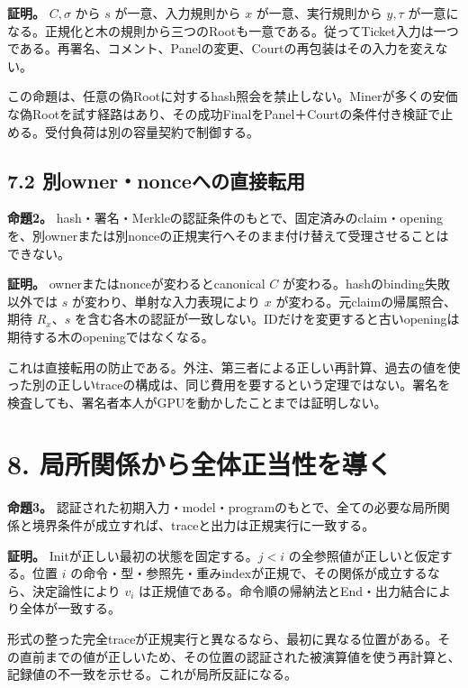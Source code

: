 \documentclass[
  10pt,
]{article}
\begin{document}
\textbf{証明。} \(C,\sigma\) から \(s\) が一意、入力規則から \(x\)
が一意、実行規則から \(y,\tau\)
が一意になる。正規化と木の規則から三つのRootも一意である。従ってTicket入力は一つである。再署名、コメント、Panelの変更、Courtの再包装はその入力を変えない。

この命題は、任意の偽Rootに対するhash照会を禁止しない。Minerが多くの安価な偽Rootを試す経路はあり、その成功FinalをPanel＋Courtの条件付き検証で止める。受付負荷は別の容量契約で制御する。

\subsection{7.2
別owner・nonceへの直接転用}\label{ux5225ownernonceux3078ux306eux76f4ux63a5ux8ee2ux7528}

\textbf{命題2。}
hash・署名・Merkleの認証条件のもとで、固定済みのclaim・openingを、別ownerまたは別nonceの正規実行へそのまま付け替えて受理させることはできない。

\textbf{証明。} ownerまたはnonceが変わるとcanonical \(C\)
が変わる。hashのbinding失敗以外では \(s\) が変わり、単射な入力表現により
\(x\) が変わる。元claimの帰属照合、期待 \(R_x\)、\(s\)
を含む各木の認証が一致しない。IDだけを変更すると古いopeningは期待する木のopeningではなくなる。

これは直接転用の防止である。外注、第三者による正しい再計算、過去の値を使った別の正しいtraceの構成は、同じ費用を要するという定理ではない。署名を検査しても、署名者本人がGPUを動かしたことまでは証明しない。

\section{8.
局所関係から全体正当性を導く}\label{ux5c40ux6240ux95a2ux4fc2ux304bux3089ux5168ux4f53ux6b63ux5f53ux6027ux3092ux5c0eux304f}

\textbf{命題3。}
認証された初期入力・model・programのもとで、全ての必要な局所関係と境界条件が成立すれば、traceと出力は正規実行に一致する。

\textbf{証明。} Initが正しい最初の状態を固定する。\(j<i\)
の全参照値が正しいと仮定する。位置 \(i\)
の命令・型・参照先・重みindexが正規で、その関係が成立するなら、決定論性により
\(v_i\)
は正規値である。命令順の帰納法とEnd・出力結合により全体が一致する。

形式の整った完全traceが正規実行と異なるなら、最初に異なる位置がある。その直前までの値が正しいため、その位置の認証された被演算値を使う再計算と、記録値の不一致を示せる。これが局所反証になる。
\end{document}
